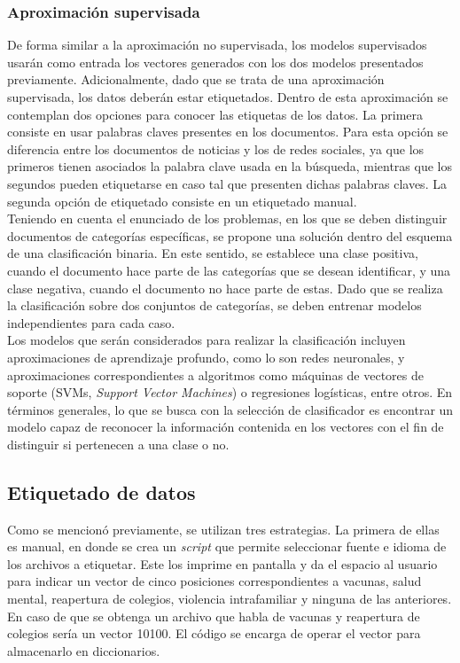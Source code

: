 \subsubsection{Aproximación supervisada}
De forma similar a la aproximación no supervisada, los modelos supervisados usarán como entrada los vectores generados con los dos modelos presentados previamente. Adicionalmente, dado que se trata de una aproximación supervisada, los datos deberán estar etiquetados. Dentro de esta aproximación se contemplan dos opciones para conocer las etiquetas de los datos. La primera consiste en usar palabras claves presentes en los documentos. Para esta opción se diferencia entre los documentos de noticias y los de redes sociales, ya que los primeros tienen asociados la palabra clave usada en la búsqueda, mientras que los segundos pueden etiquetarse en caso tal que presenten dichas palabras claves. La segunda opción de etiquetado consiste en un etiquetado manual.\\

Teniendo en cuenta el enunciado de los problemas, en los que se deben distinguir documentos de categorías específicas, se propone una solución dentro del esquema de una clasificación binaria. En este sentido, se establece una clase positiva, cuando el documento hace parte de las categorías que se desean identificar, y una clase negativa, cuando el documento no hace parte de estas. Dado que se realiza la clasificación sobre dos conjuntos de categorías, se deben entrenar modelos independientes para cada caso. \\

Los modelos que serán considerados para realizar la clasificación incluyen aproximaciones de aprendizaje profundo, como lo son redes neuronales, y aproximaciones correspondientes a algoritmos como máquinas de vectores de soporte (SVMs, \textit{Support Vector Machines}) o regresiones logísticas, entre otros. En términos generales, lo que se busca con la selección de clasificador es encontrar un modelo capaz de reconocer la información contenida en los vectores con el fin de distinguir si pertenecen a una clase o no.

\subsection{Etiquetado de datos}
Como se mencionó previamente, se utilizan tres estrategias. La primera de ellas es manual, en donde se crea un \textit{script} que permite seleccionar fuente e idioma de los archivos a etiquetar. Este los imprime en pantalla y da el espacio al usuario para indicar un vector de cinco posiciones correspondientes a vacunas, salud mental, reapertura de colegios, violencia intrafamiliar y ninguna de las anteriores. En caso de que se obtenga un archivo que habla de vacunas y reapertura de colegios sería un vector 10100. El código se encarga de operar el vector para almacenarlo en diccionarios.\\

